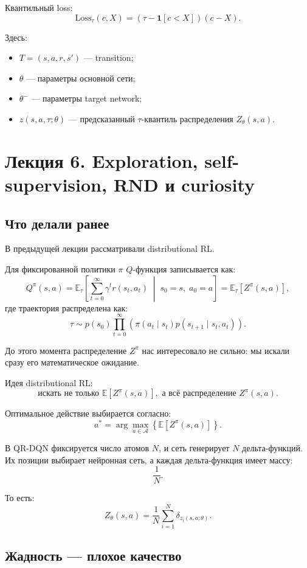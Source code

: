\documentclass[12pt,a4paper]{article}
\begin{document}
Квантильный loss:
\[
\mathrm{Loss}_{\tau}(c,X)
=
\left(
\tau
-
\mathbf 1[c<X]
\right)
(c-X).
\]

Здесь:
\begin{itemize}
    \item $T=(s,a,r,s')$ --- transition;
    \item $\theta$ --- параметры основной сети;
    \item $\theta^-$ --- параметры target network;
    \item $z(s,a,\tau;\theta)$ --- предсказанный $\tau$-квантиль распределения $Z_\theta(s,a)$.
\end{itemize}


\section{Лекция 6. Exploration, self-supervision, RND и curiosity}

\subsection{Что делали ранее}

В предыдущей лекции рассматривали distributional RL.

Для фиксированной политики $\pi$ $Q$-функция записывается как:
\[
Q^\pi(s,a)
=
\mathbb E_\tau
\left[
\sum_{t=0}^{\infty}
\gamma^t r(s_t,a_t)
\;\middle|\;
s_0=s,\;a_0=a
\right]
=
\mathbb E_\tau
\left[
Z^\pi(s,a)
\right],
\]
где траектория распределена как:
\[
\tau
\sim
p(s_0)
\prod_{t=0}^{\infty}
\left(
\pi(a_t\mid s_t)
p(s_{t+1}\mid s_t,a_t)
\right).
\]

До этого момента распределение $Z^\pi$ нас интересовало не сильно: мы искали сразу его математическое ожидание.

Идея distributional RL:
\[
\text{искать не только } \mathbb E[Z^\pi(s,a)], \text{ а всё распределение } Z^\pi(s,a).
\]

Оптимальное действие выбирается согласно:
\[
a^\ast
=
\arg\max_{a\in\mathcal A}
\left\{
\mathbb E
\left[
Z^\pi(s,a)
\right]
\right\}.
\]

В QR-DQN фиксируется число атомов $N$, и сеть генерирует $N$ дельта-функций. Их позиции выбирает нейронная сеть, а каждая дельта-функция имеет массу:
\[
\frac{1}{N}.
\]

То есть:
\[
Z_\theta(s,a)
=
\frac{1}{N}
\sum_{i=1}^{N}
\delta_{z_i(s,a;\theta)}.
\]

\subsection{Жадность --- плохое качество}
\end{document}
